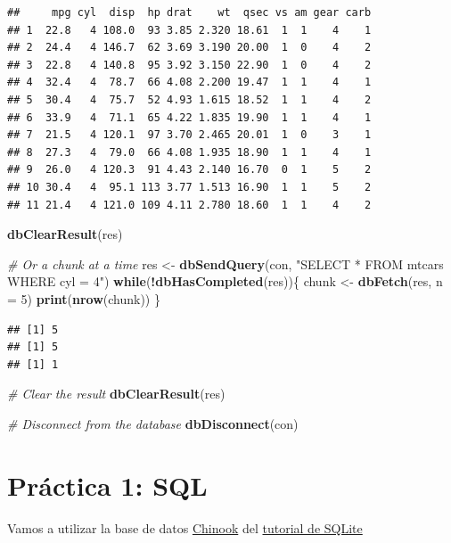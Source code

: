 \documentclass[]{book}
\newenvironment{Shaded}{\begin{snugshade}}{\end{snugshade}}
\newcommand{\KeywordTok}[1]{\textcolor[rgb]{0.13,0.29,0.53}{\textbf{#1}}}
\newcommand{\DataTypeTok}[1]{\textcolor[rgb]{0.13,0.29,0.53}{#1}}
\newcommand{\DecValTok}[1]{\textcolor[rgb]{0.00,0.00,0.81}{#1}}
\newcommand{\StringTok}[1]{\textcolor[rgb]{0.31,0.60,0.02}{#1}}
\newcommand{\CommentTok}[1]{\textcolor[rgb]{0.56,0.35,0.01}{\textit{#1}}}
\newcommand{\ControlFlowTok}[1]{\textcolor[rgb]{0.13,0.29,0.53}{\textbf{#1}}}
\newcommand{\OperatorTok}[1]{\textcolor[rgb]{0.81,0.36,0.00}{\textbf{#1}}}
\newcommand{\NormalTok}[1]{#1}
\begin{document}
\begin{verbatim}
##     mpg cyl  disp  hp drat    wt  qsec vs am gear carb
## 1  22.8   4 108.0  93 3.85 2.320 18.61  1  1    4    1
## 2  24.4   4 146.7  62 3.69 3.190 20.00  1  0    4    2
## 3  22.8   4 140.8  95 3.92 3.150 22.90  1  0    4    2
## 4  32.4   4  78.7  66 4.08 2.200 19.47  1  1    4    1
## 5  30.4   4  75.7  52 4.93 1.615 18.52  1  1    4    2
## 6  33.9   4  71.1  65 4.22 1.835 19.90  1  1    4    1
## 7  21.5   4 120.1  97 3.70 2.465 20.01  1  0    3    1
## 8  27.3   4  79.0  66 4.08 1.935 18.90  1  1    4    1
## 9  26.0   4 120.3  91 4.43 2.140 16.70  0  1    5    2
## 10 30.4   4  95.1 113 3.77 1.513 16.90  1  1    5    2
## 11 21.4   4 121.0 109 4.11 2.780 18.60  1  1    4    2
\end{verbatim}

\begin{Shaded}
\begin{Highlighting}[]
\KeywordTok{dbClearResult}\NormalTok{(res)}

\CommentTok{# Or a chunk at a time}
\NormalTok{res <-}\StringTok{ }\KeywordTok{dbSendQuery}\NormalTok{(con, }\StringTok{"SELECT * FROM mtcars WHERE cyl = 4"}\NormalTok{)}
\ControlFlowTok{while}\NormalTok{(}\OperatorTok{!}\KeywordTok{dbHasCompleted}\NormalTok{(res))\{}
\NormalTok{  chunk <-}\StringTok{ }\KeywordTok{dbFetch}\NormalTok{(res, }\DataTypeTok{n =} \DecValTok{5}\NormalTok{)}
  \KeywordTok{print}\NormalTok{(}\KeywordTok{nrow}\NormalTok{(chunk))}
\NormalTok{\}}
\end{Highlighting}
\end{Shaded}

\begin{verbatim}
## [1] 5
## [1] 5
## [1] 1
\end{verbatim}

\begin{Shaded}
\begin{Highlighting}[]
\CommentTok{# Clear the result}
\KeywordTok{dbClearResult}\NormalTok{(res)}

\CommentTok{# Disconnect from the database}
\KeywordTok{dbDisconnect}\NormalTok{(con)}
\end{Highlighting}
\end{Shaded}

\section{Práctica 1: SQL}\label{practica-1-sql}

Vamos a utilizar la base de datos
\href{https://www.sqlitetutorial.net/wp-content/uploads/2018/03/chinook.zip}{Chinook}
del
\href{https://www.sqlitetutorial.net/sqlite-sample-database/}{tutorial
de SQLite}
\end{document}
